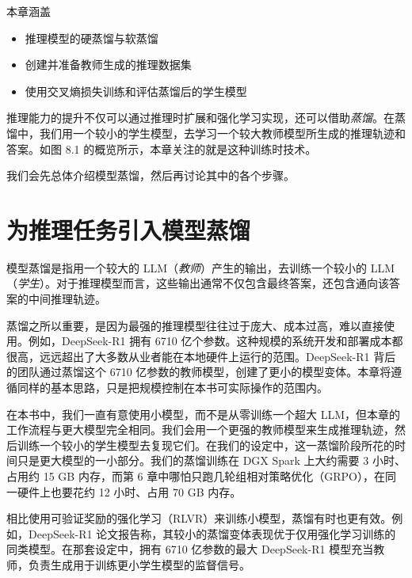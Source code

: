 \begin{myChapterIntro}{本章涵盖}
\begin{itemize}
\item 推理模型的硬蒸馏与软蒸馏
\item 创建并准备教师生成的推理数据集
\item 使用交叉熵损失训练和评估蒸馏后的学生模型
\end{itemize}
\end{myChapterIntro}

推理能力的提升不仅可以通过推理时扩展和强化学习实现，还可以借助\emph{蒸馏}。在蒸馏中，我们用一个较小的学生模型，去学习一个较大教师模型所生成的推理轨迹和答案。如图 8.1 的概览所示，本章关注的就是这种训练时技术。


我们会先总体介绍模型蒸馏，然后再讨论其中的各个步骤。

\section{为推理任务引入模型蒸馏}

模型蒸馏是指用一个较大的 LLM（\emph{教师}）产生的输出，去训练一个较小的 LLM（\emph{学生}）。对于推理模型而言，这些输出通常不仅包含最终答案，还包含通向该答案的中间推理轨迹。

蒸馏之所以重要，是因为最强的推理模型往往过于庞大、成本过高，难以直接使用。例如，DeepSeek-R1 拥有 6710 亿个参数。这种规模的系统开发和部署成本都很高，远远超出了大多数从业者能在本地硬件上运行的范围。DeepSeek-R1 背后的团队通过蒸馏这个 6710 亿参数的教师模型，创建了更小的模型变体。本章将遵循同样的基本思路，只是把规模控制在本书可实际操作的范围内。

在本书中，我们一直有意使用小模型，而不是从零训练一个超大 LLM，但本章的工作流程与更大模型完全相同。我们会用一个更强的教师模型来生成推理轨迹，然后训练一个较小的学生模型去复现它们。在我们的设定中，这一蒸馏阶段所花的时间只是更大模型的一小部分。我们的蒸馏训练在 DGX Spark 上大约需要 3 小时、占用约 15 GB 内存，而第 6 章中哪怕只跑几轮组相对策略优化（GRPO），在同一硬件上也要花约 12 小时、占用 70 GB 内存。

相比使用可验证奖励的强化学习（RLVR）来训练小模型，蒸馏有时也更有效。例如，DeepSeek-R1 论文报告称，其较小的蒸馏变体表现优于仅用强化学习训练的同类模型。在那套设定中，拥有 6710 亿参数的最大 DeepSeek-R1 模型充当教师，负责生成用于训练更小学生模型的监督信号。

